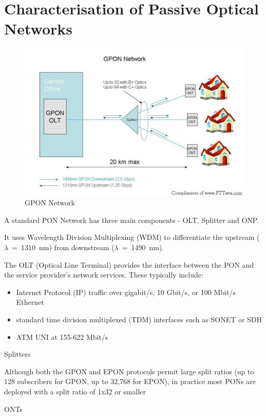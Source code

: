 \section{Characterisation of Passive Optical Networks}

\begin{figure}%
\includegraphics[width=\columnwidth]{grafiken/gpon.jpg}%
\caption{GPON Network}%
\label{}%
\end{figure}

A standard PON Network has three main components - OLT, Splitter and ONP.

It uses Wavelength Division Multiplexing (WDM) to differentiate the upstream ($\lambda$~=~1310~nm) from downstream ($\lambda~=~$1490~nm).

The OLT (Optical Line Terminal) provides the interface between the PON and the service provider's network services. These typically include:

\begin{itemize}
	\item Internet Protocol (IP) traffic over gigabit/s, 10 Gbit/s, or 100 Mbit/s Ethernet
\item standard time division multiplexed (TDM) interfaces such as SONET or SDH
\item ATM UNI at 155-622 Mbit/s
\end{itemize}

Splitters

Although both the GPON and EPON protocols permit large split ratios (up to 128 subscribers for GPON, up to 32,768 for EPON), in practice most PONs are deployed with a split ratio of 1x32 or smaller


ONTs

